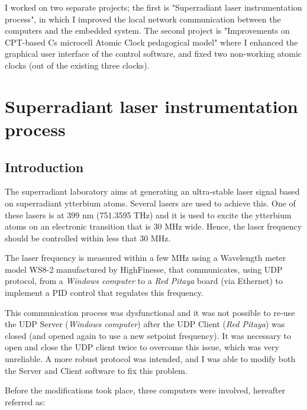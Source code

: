 \documentclass[a4paper,12pt]{article}
\begin{document}
I worked on two separate projects; the first is "Superradiant laser instrumentation process", in which I improved the local network communication between the computers and the embedded system. The second project is "Improvements on CPT-based Cs microcell Atomic Clock pedagogical model" where I enhanced the graphical user interface of the control software, and fixed two non-working atomic clocks (out of the existing three clocks).

\section{Superradiant laser instrumentation process}
\subsection{Introduction}
The superradiant laboratory aims at generating an ultra-stable laser signal based on superradiant ytterbium atoms. Several lasers are used to achieve this. One of these lasers is at 399 nm (751.3595 THz) and it is used to excite the ytterbium atoms on an electronic transition that is 30 MHz wide. Hence, the laser frequency should be controlled within less that 30 MHz.

The laser frequency is measured within a few MHz using a Wavelength meter model WS8-2 manufactured by HighFinesse, that communicates, using UDP protocol, from a \textit{Windows computer} to a \textit{Red Pitaya} board (via Ethernet) to implement a PID control that regulates this frequency.

This communication process was dysfunctional and it was not possible to re-use the UDP Server (\textit{Windows computer}) after the UDP Client (\textit{Red Pitaya}) was closed (and opened again to use a new setpoint frequency). It was necessary to open and close the UDP client twice to overcome this issue, which was very unreliable. A more robust protocol was intended, and I was able to modify both the Server and Client software to fix this problem.

Before the modifications took place, three computers were involved, hereafter referred as:
\end{document}
